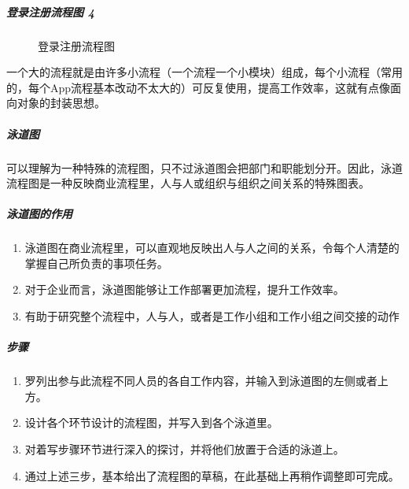 \documentclass[letterpaper,10pt,english]{sphinxmanual}
\begin{document}
\subparagraph{登录注册流程图 4\sphinxfootnotemark[590]}
\label{\detokenize{chapter_knowledge/flow_chart:id20}}%
\begin{footnotetext}[590]\sphinxAtStartFootnote
{}
%
\end{footnotetext}\ignorespaces 
\begin{figure}[H]
\centering
\capstart

\noindent{}
\caption{登录注册流程图}\label{\detokenize{chapter_knowledge/flow_chart:id45}}\end{figure}

一个大的流程就是由许多小流程（一个流程一个小模块）组成，每个小流程（常用的，每个App流程基本改动不太大的）可反复使用，提高工作效率，这就有点像面向对象的封装思想。


\subparagraph{泳道图}
\label{\detokenize{chapter_knowledge/flow_chart:id21}}
可以理解为一种特殊的流程图，只不过泳道图会把部门和职能划分开。因此，泳道流程图是一种反映商业流程里，人与人或组织与组织之间关系的特殊图表。


\subparagraph{泳道图的作用}
\label{\detokenize{chapter_knowledge/flow_chart:id22}}\begin{enumerate}
%
\item {} 
泳道图在商业流程里，可以直观地反映出人与人之间的关系，令每个人清楚的掌握自己所负责的事项任务。

\item {} 
对于企业而言，泳道图能够让工作部署更加流程，提升工作效率。

\item {} 
有助于研究整个流程中，人与人，或者是工作小组和工作小组之间交接的动作

\end{enumerate}


\subparagraph{步骤}
\label{\detokenize{chapter_knowledge/flow_chart:id23}}\begin{enumerate}
%
\item {} 
罗列出参与此流程不同人员的各自工作内容，并输入到泳道图的左侧或者上方。

\item {} 
设计各个环节设计的流程图，并写入到各个泳道里。

\item {} 
对着写步骤环节进行深入的探讨，并将他们放置于合适的泳道上。

\item {} 
通过上述三步，基本给出了流程图的草稿，在此基础上再稍作调整即可完成。

\end{enumerate}
\end{document}
